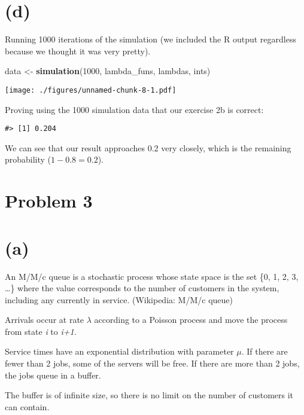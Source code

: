 \documentclass[]{article}
\newenvironment{Shaded}{\begin{snugshade}}{\end{snugshade}}
\newcommand{\DecValTok}[1]{\textcolor[rgb]{0.00,0.00,0.81}{#1}}
\newcommand{\KeywordTok}[1]{\textcolor[rgb]{0.13,0.29,0.53}{\textbf{#1}}}
\newcommand{\NormalTok}[1]{#1}
\newcommand{\StringTok}[1]{\textcolor[rgb]{0.31,0.60,0.02}{#1}}
\begin{document}
\newpage

\hypertarget{d}{%
\section{(d)}\label{d}}

Running 1000 iterations of the simulation (we included the R output
regardless because we thought it was very pretty).

\begin{Shaded}
\begin{Highlighting}[]
\NormalTok{data <-}\StringTok{ }\KeywordTok{simulation}\NormalTok{(}\DecValTok{1000}\NormalTok{, lambda_funs, lambdas, ints)}
\end{Highlighting}
\end{Shaded}

\texttt{[image: ./figures/unnamed-chunk-8-1.pdf]}

Proving using the 1000 simulation data that our exercise 2b is correct:

\begin{verbatim}
#> [1] 0.204
\end{verbatim}

We can see that our result approaches 0.2 very closely, which is the
remaining probability (\(1-0.8 = 0.2\)).

\hypertarget{problem-3}{%
\section{Problem 3}\label{problem-3}}

\hypertarget{a-1}{%
\section{(a)}\label{a-1}}

An M/M/c queue is a stochastic process whose state space is the set \{0,
1, 2, 3, \ldots{}\} where the value corresponds to the number of
customers in the system, including any currently in service. (Wikipedia:
M/M/c queue)

Arrivals occur at rate \(\lambda\) according to a Poisson process and
move the process from state \emph{i} to \emph{i+1}.

Service times have an exponential distribution with parameter \(\mu\).
If there are fewer than 2 jobs, some of the servers will be free. If
there are more than 2 jobs, the jobs queue in a buffer.

The buffer is of infinite size, so there is no limit on the number of
customers it can contain.
\end{document}
